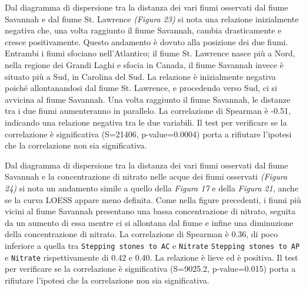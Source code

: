 \documentclass{article} %
\begin{document}
Dal diagramma di dispersione tra la distanza dei vari fiumi osservati dal fiume Savannah e dal fiume St. Lawrence \textit{(Figura 23)} si nota una relazione inizialmente negativa che, una volta raggiunto il fiume Savannah, cambia drasticamente e cresce positivamente. 
Questo andamento è dovuto alla posizione dei due fiumi. Entrambi i fiumi sfociano nell'Atlantico; il fiume St. Lawrence nasce più a Nord, nella regione dei Grandi Laghi e sfocia in Canada, il fiume Savannah invece è situato più a Sud, in Carolina del Sud. La relazione è inizialmente negativa poiché allontanandosi dal fiume St. Lawrence, e procedendo verso Sud, ci si avvicina al fiume Savannah. Una volta raggiunto il fiume Savannah, le distanze tra i due fiumi aumenteranno in parallelo.
La correlazione di Spearman è -0.51, indicando una relazione negativa tra le due variabili.  
Il test per verificare se la correlazione è significativa (S=21406, p-value=0.0004) porta a rifiutare l'ipotesi che la correlazione non sia significativa.

Dal diagramma di dispersione tra la distanza dei vari fiumi osservati dal fiume Savannah e la concentrazione di nitrato nelle acque dei fiumi osservati \textit{(Figura 24)} si nota un andamento simile a quello della \textit{Figura 17} e della \textit{Figura 21}, anche se la curva LOESS appare meno definita. 
Come nella figure precedenti, i fiumi più vicini al fiume Savannah presentano una bassa concentrazione di nitrato, seguita da un aumento di essa mentre ci si allontana dal fiume e infine una diminuzione della concentrazione di nitrato.
La correlazione di Spearman è 0.36, di poco inferiore a quella tra \texttt{Stepping stones to AC} e \texttt{Nitrate} \texttt{Stepping stones to AP} e \texttt{Nitrate} rispettivamente di 0.42 e 0.40. La relazione è lieve ed è positiva. 
Il test per verificare se la correlazione è significativa (S=9025.2, p-value=0.015) porta a rifiutare l'ipotesi che la correlazione non sia significativa.
\end{document}
